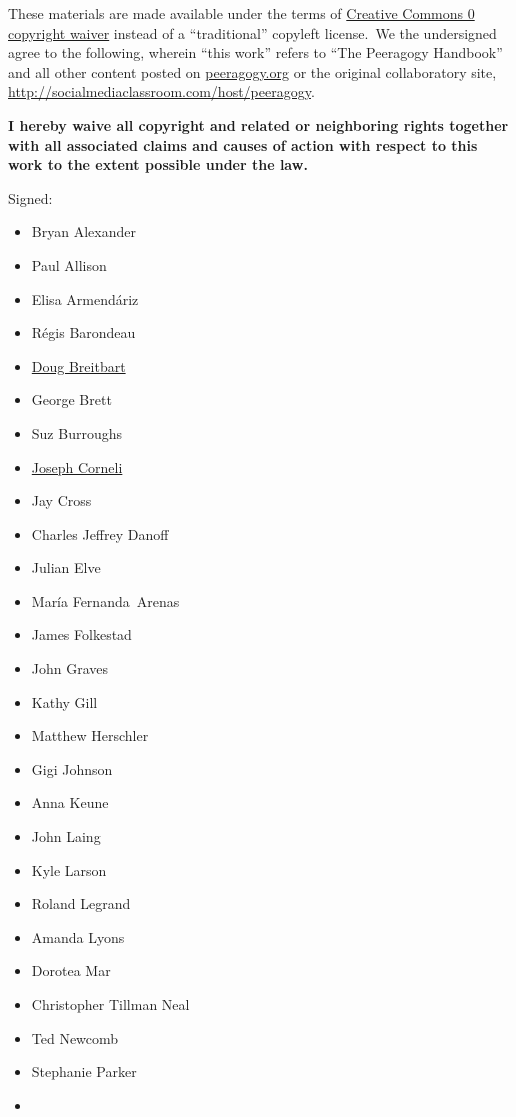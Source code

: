 These materials are made available under the terms of
\href{http://creativecommons.org/publicdomain/zero/1.0/}{Creative
Commons 0 copyright waiver} instead of a ``traditional'' copyleft
license.~We the undersigned agree to the following, wherein ``this
work'' refers to ``The Peeragogy Handbook'' and all other content posted
on \href{http://peeragogy.org}{peeragogy.org} or the original
collaboratory site,
\url{http://socialmediaclassroom.com/host/peeragogy}.

\textbf{I hereby waive all copyright and related or neighboring rights
together with all associated claims and causes of action with respect to
this work to the extent possible under the law.}

Signed:

\begin{itemize}
\tightlist
\item
  Bryan Alexander
\item
  Paul Allison
\item
  Elisa Armendáriz
\item
  Régis Barondeau
\item
  \href{https://www.linkedin.com/in/dougbreitbart}{Doug Breitbart}
\item
  George Brett
\item
  Suz Burroughs
\item
  \href{http://metameso.org/~joe}{Joseph Corneli}
\item
  Jay Cross
\item
  Charles Jeffrey Danoff
\item
  Julian Elve
\item
  María Fernanda~Arenas
\item
  James Folkestad
\item
  John Graves
\item
  Kathy Gill
\item
  Matthew Herschler
\item
  Gigi Johnson
\item
  Anna Keune
\item
  John Laing
\item
  Kyle Larson
\item
  Roland Legrand
\item
  Amanda Lyons
\item
  Dorotea Mar
\item
  Christopher Tillman Neal
\item
  Ted Newcomb
\item
  Stephanie Parker
\item

\end{itemize}
